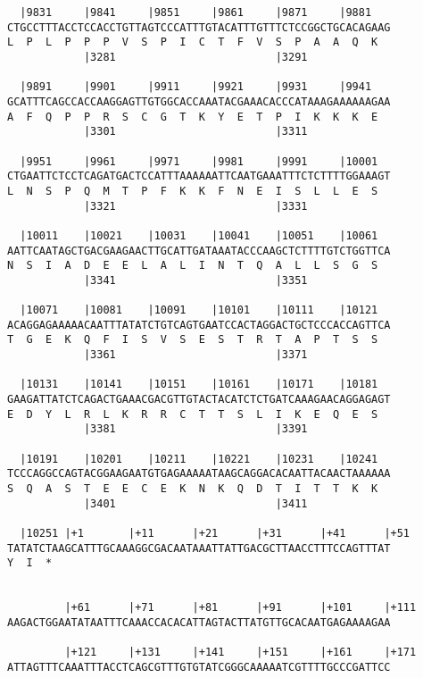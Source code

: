 \documentclass{article}
\begin{document}
\begin{Verbatim}
  |9831     |9841     |9851     |9861     |9871     |9881   
CTGCCTTTACCTCCACCTGTTAGTCCCATTTGTACATTTGTTTCTCCGGCTGCACAGAAG
L  P  L  P  P  P  V  S  P  I  C  T  F  V  S  P  A  A  Q  K  
            |3281                         |3291             
  
  |9891     |9901     |9911     |9921     |9931     |9941   
GCATTTCAGCCACCAAGGAGTTGTGGCACCAAATACGAAACACCCATAAAGAAAAAAGAA
A  F  Q  P  P  R  S  C  G  T  K  Y  E  T  P  I  K  K  K  E  
            |3301                         |3311             
  
  |9951     |9961     |9971     |9981     |9991     |10001  
CTGAATTCTCCTCAGATGACTCCATTTAAAAAATTCAATGAAATTTCTCTTTTGGAAAGT
L  N  S  P  Q  M  T  P  F  K  K  F  N  E  I  S  L  L  E  S  
            |3321                         |3331             
  
  |10011    |10021    |10031    |10041    |10051    |10061  
AATTCAATAGCTGACGAAGAACTTGCATTGATAAATACCCAAGCTCTTTTGTCTGGTTCA
N  S  I  A  D  E  E  L  A  L  I  N  T  Q  A  L  L  S  G  S  
            |3341                         |3351             
  
  |10071    |10081    |10091    |10101    |10111    |10121  
ACAGGAGAAAAACAATTTATATCTGTCAGTGAATCCACTAGGACTGCTCCCACCAGTTCA
T  G  E  K  Q  F  I  S  V  S  E  S  T  R  T  A  P  T  S  S  
            |3361                         |3371             
  
  |10131    |10141    |10151    |10161    |10171    |10181  
GAAGATTATCTCAGACTGAAACGACGTTGTACTACATCTCTGATCAAAGAACAGGAGAGT
E  D  Y  L  R  L  K  R  R  C  T  T  S  L  I  K  E  Q  E  S  
            |3381                         |3391             
  
  |10191    |10201    |10211    |10221    |10231    |10241  
TCCCAGGCCAGTACGGAAGAATGTGAGAAAAATAAGCAGGACACAATTACAACTAAAAAA
S  Q  A  S  T  E  E  C  E  K  N  K  Q  D  T  I  T  T  K  K  
            |3401                         |3411             
  
  |10251 |+1       |+11      |+21      |+31      |+41      |+51
TATATCTAAGCATTTGCAAAGGCGACAATAAATTATTGACGCTTAACCTTTCCAGTTTAT
Y  I  *   
                                                            
  
         |+61      |+71      |+81      |+91      |+101     |+111
AAGACTGGAATATAATTTCAAACCACACATTAGTACTTATGTTGCACAATGAGAAAAGAA
                                                            
         |+121     |+131     |+141     |+151     |+161     |+171
ATTAGTTTCAAATTTACCTCAGCGTTTGTGTATCGGGCAAAAATCGTTTTGCCCGATTCC
                                                            

\end{Verbatim}
\end{document}

